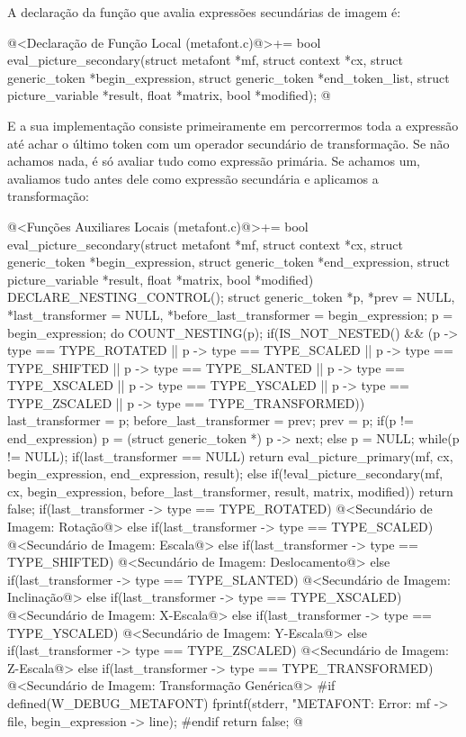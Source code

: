 {A declaração da função que avalia expressões secundárias de imagem é:

\iniciocodigo
@<Declaração de Função Local (metafont.c)@>+=
bool eval_picture_secondary(struct metafont *mf, struct context *cx,
                            struct generic_token *begin_expression,
                            struct generic_token *end_token_list,
                            struct picture_variable *result,
                            float *matrix, bool *modified);
@
\fimcodigo

E a sua implementação consiste primeiramente em percorrermos toda a
expressão até achar o último token com um operador secundário de
transformação. Se não achamos nada, é só avaliar tudo como expressão
primária. Se achamos um, avaliamos tudo antes dele como expressão
secundária e aplicamos a transformação:

\iniciocodigo
@<Funções Auxiliares Locais (metafont.c)@>+=
bool eval_picture_secondary(struct metafont *mf, struct context *cx,
                            struct generic_token *begin_expression,
                            struct generic_token *end_expression,
                            struct picture_variable *result,
                            float *matrix, bool *modified){
  DECLARE_NESTING_CONTROL();
  struct generic_token *p, *prev = NULL, *last_transformer = NULL,
                       *before_last_transformer = begin_expression;
  p = begin_expression;
  do{
    COUNT_NESTING(p);
    if(IS_NOT_NESTED() && (p -> type == TYPE_ROTATED ||
       p -> type == TYPE_SCALED || p -> type == TYPE_SHIFTED ||
       p -> type == TYPE_SLANTED || p -> type == TYPE_XSCALED ||
       p -> type == TYPE_YSCALED || p -> type == TYPE_ZSCALED ||
       p -> type == TYPE_TRANSFORMED)){
      last_transformer = p;
      before_last_transformer = prev;
    }
    prev = p;
    if(p != end_expression)
      p = (struct generic_token *) p -> next;
    else
      p = NULL;
  }while(p != NULL);
  if(last_transformer == NULL)
    return eval_picture_primary(mf, cx, begin_expression, end_expression, result);
  else{
    if(!eval_picture_secondary(mf, cx, begin_expression,
                               before_last_transformer, result, matrix, modified))
      return false;
    if(last_transformer -> type == TYPE_ROTATED){
      @<Secundário de Imagem: Rotação@>
    }
    else if(last_transformer -> type == TYPE_SCALED){
      @<Secundário de Imagem: Escala@>
    }
    else if(last_transformer -> type == TYPE_SHIFTED){
      @<Secundário de Imagem: Deslocamento@>
    }
    else if(last_transformer -> type == TYPE_SLANTED){
      @<Secundário de Imagem: Inclinação@>
    }
    else if(last_transformer -> type == TYPE_XSCALED){
      @<Secundário de Imagem: X-Escala@>
    }
    else if(last_transformer -> type == TYPE_YSCALED){
      @<Secundário de Imagem: Y-Escala@>
    }
    else if(last_transformer -> type == TYPE_ZSCALED){
      @<Secundário de Imagem: Z-Escala@>
    }
    else if(last_transformer -> type == TYPE_TRANSFORMED){
      @<Secundário de Imagem: Transformação Genérica@>
    }
#if defined(W_DEBUG_METAFONT)
    fprintf(stderr, "METAFONT: Error: %
            mf -> file, begin_expression -> line);
#endif
    return false;
  }
}
@
\fimcodigo

}
